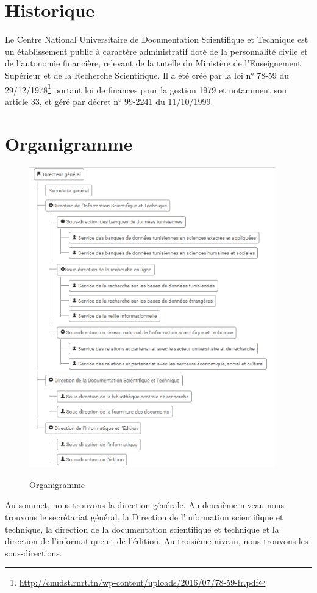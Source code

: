 \section{Historique}
Le Centre National Universitaire de Documentation Scientifique et Technique est un établissement public à caractère administratif doté de la personnalité civile et de l’autonomie financière, relevant de la tutelle du Ministère de l’Enseignement Supérieur et de la Recherche Scientifique.
Il a été créé par la loi n° 78-59 du 29/12/1978\footnote{\url{http://cnudst.rnrt.tn/wp-content/uploads/2016/07/78-59-fr.pdf}} portant loi de finances pour la gestion 1979 et notamment son article 33, et géré par décret n° 99-2241 du 11/10/1999. 
\section{Organigramme}
\begin{figure}[!p]
	\centering
{\includegraphics[width=0.95\textwidth]{D) IMAGES/imOrg.png}}
	\caption{Organigramme}
	\label{Org}
\end{figure}

Au sommet, nous trouvons la direction générale. Au deuxième niveau nous trouvons le secrétariat général, la Direction de l'information scientifique et technique, la direction de la documentation scientifique et technique et la direction de l'informatique et de l'édition. Au troisième niveau, nous trouvons les sous-directions.
\newpage

